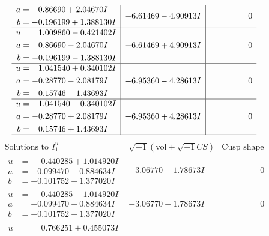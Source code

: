 \documentclass[1p]{elsarticle_modified}
\theoremstyle{definition}
\newcommand{\I}{\sqrt{-1}}
\begin{document}
$$\begin{array}{c|c|c}
\begin{aligned}
a &= \phantom{-}0.86690 + 2.04670 I \\
b &= -0.196199 + 1.388130 I\end{aligned}
 & -6.61469 - 4.90913 I & \phantom{-0.000000 } 0 \\ \hline\begin{aligned}
u &= \phantom{-}1.009860 - 0.421402 I \\
a &= \phantom{-}0.86690 - 2.04670 I \\
b &= -0.196199 - 1.388130 I\end{aligned}
 & -6.61469 + 4.90913 I & \phantom{-0.000000 } 0 \\ \hline\begin{aligned}
u &= \phantom{-}1.041540 + 0.340102 I \\
a &= -0.28770 - 2.08179 I \\
b &= \phantom{-}0.15746 - 1.43693 I\end{aligned}
 & -6.95360 - 4.28613 I & \phantom{-0.000000 } 0 \\ \hline\begin{aligned}
u &= \phantom{-}1.041540 - 0.340102 I \\
a &= -0.28770 + 2.08179 I \\
b &= \phantom{-}0.15746 + 1.43693 I\end{aligned}
 & -6.95360 + 4.28613 I & \phantom{-0.000000 } 0\\
 \hline 
 \end{array}$$\newpage$$\begin{array}{c|c|c}  
\text{Solutions to }I^u_{1}& \I (\text{vol} + \sqrt{-1}CS) & \text{Cusp shape}\\
 \hline 
\begin{aligned}
u &= \phantom{-}0.440285 + 1.014920 I \\
a &= -0.099470 - 0.884634 I \\
b &= -0.101752 - 1.377020 I\end{aligned}
 & -3.06770 - 1.78673 I & \phantom{-0.000000 } 0 \\ \hline\begin{aligned}
u &= \phantom{-}0.440285 - 1.014920 I \\
a &= -0.099470 + 0.884634 I \\
b &= -0.101752 + 1.377020 I\end{aligned}
 & -3.06770 + 1.78673 I & \phantom{-0.000000 } 0 \\ \hline\begin{aligned}
u &= \phantom{-}0.766251 + 0.455073 I \\

\end{aligned}
\end{array}$$
\end{document}
